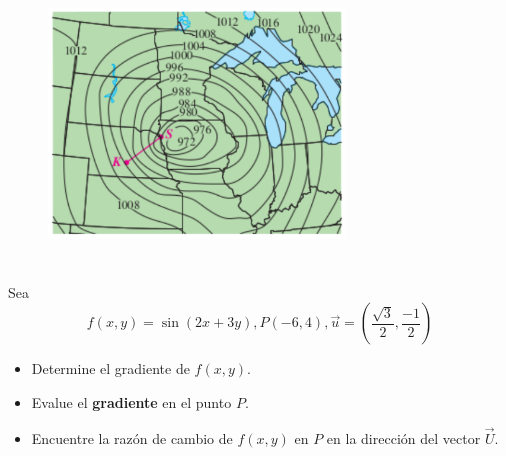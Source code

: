 \documentclass[12pt]{article}
\begin{document}
\begin{figure}[H]
  \centering
  \includegraphics[width=0.7\textwidth]{./img/t3_ej12.png}
\end{figure}

\section{}

Sea $$f(x, y) = \sin{(2x + 3y)}, P(-6, 4), \vec{u}=\left(\frac{\sqrt{3}}{2},\frac{-1}{2} \right)$$

\begin{itemize}[format=\textbf]

\item Determine el gradiente de $f(x, y)$.

\item Evalue el \textbf{gradiente} en el punto $P$.

\item Encuentre la razón de cambio de $f(x, y)$ en $P$ en la dirección del vector $\vec{U}$.

\end{itemize}
\end{document}

